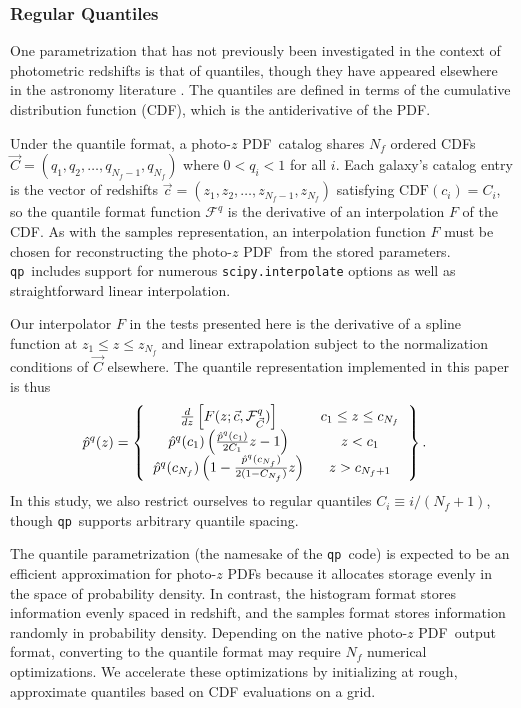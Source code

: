 \documentclass[\docopts]{\docclass}
\newcommand{\qp}{\texttt{qp}}
\newcommand{\pz}{photo-$z$ PDF}
\begin{document}
\subsubsection{Regular Quantiles}
\label{sec:quantiles}

One parametrization that has not previously been investigated in the context of 
photometric redshifts is that of quantiles, though they have appeared elsewhere 
in the astronomy literature \citep{sun_star_2015, pizzocaro_results_2016, 
laycock_x-ray_2017}.
The quantiles are defined in terms of the cumulative distribution function 
(CDF), which is the antiderivative of the PDF.

Under the quantile format, a \pz\ catalog shares $N_{f}$ ordered CDFs $\vec{C} 
= (q_{1}, q_{2}, \dots, q_{N_{f}-1}, q_{N_{f}})$ where $0 < q_{i} < 1$ for all 
$i$.
Each galaxy's catalog entry is the vector of redshifts $\vec{c} = (z_{1}, 
z_{2}, \dots, z_{N_{f}-1}, z_{N_{f}})$ satisfying $\mathrm{CDF}(c_{i}) = 
C_{i}$, so the quantile format function $\mathcal{F}^{q}$ is the derivative of 
an interpolation $F$ of the CDF.
As with the samples representation, an interpolation function $F$ must be 
chosen for reconstructing the \pz\ from the stored parameters.
\qp\ includes support for numerous \texttt{scipy.interpolate} options as well 
as straightforward linear interpolation.

Our interpolator $F$ in the tests presented here is the derivative of a spline 
function at $z_{1} \leq z \leq z_{N_{f}}$ and linear extrapolation subject to 
the normalization conditions of $\vec{C}$ elsewhere.
The quantile representation implemented in this paper is thus
\begin{align}
  \label{eq:quantiles}
  \hat{p}^{q}(z) &=
  \left\{
  \begin{tabular}{cc}
  $\frac{d}{dz} \left[F(z; \vec{c}, \mathcal{F}^{q}_{\vec{C}})\right]$ & $c_{1} 
\leq z \leq c_{N_{f}}$ \\
  $\hat{p}^{q}(c_{1})\left(\frac{\hat{p}^{q}(c_{1})}{2C_{1}} z - 1\right)$ & $z 
< c_{1}$ \\
  $\hat{p}^{q}(c_{N_{f}})\left(1 - \frac{\hat{p}^{q}(c_{N_{f}})}{2(1 - 
C_{N_{f}})} z\right)$ & $z > c_{N_{f}+1}$
  \end{tabular}
  \right\}.
\end{align}
In this study, we also restrict ourselves to regular quantiles $C_{i} \equiv i 
/ (N_{f} + 1)$, though \qp\ supports arbitrary quantile spacing.


The quantile parametrization (the namesake of the \qp\ code) is expected to be 
an efficient approximation for \pz s because it allocates storage evenly in the 
space of probability density.
In contrast, the histogram format stores information evenly spaced in redshift, 
and the samples format stores information randomly in probability density.
Depending on the native \pz\ output format, converting to the quantile format 
may require $N_{f}$ numerical optimizations.
We accelerate these optimizations by initializing at rough, approximate 
quantiles based on CDF evaluations on a grid.
\end{document}
